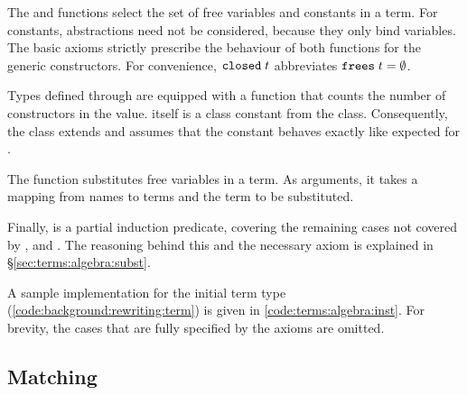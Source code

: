 The  and  functions select the set of free variables and constants in a term.
For constants, abstractions need not be considered, because they only bind variables.
The basic axioms strictly prescribe the behaviour of both functions for the generic constructors.
For convenience, $\texttt{\textup{closed}}\;t$ abbreviates $\texttt{\textup{frees}}\;t = \emptyset$.

Types defined through  are equipped with a  function that counts the number of constructors in the value.
 itself is a class constant from the  class.
Consequently, the  class extends  and assumes that the  constant behaves exactly like expected for .

The  function substitutes free variables in a term.
As arguments, it takes a mapping from names to terms and the term to be substituted.


\noindent
Finally,  is a partial induction predicate, covering the remaining cases not covered by ,  and .
The reasoning behind this and the necessary axiom is explained in §\ref{sec:terms:algebra:subst}.

A sample implementation for the initial term type  (\cref{code:background:rewriting:term}) is given in \cref{code:terms:algebra:inst}.
For brevity, the cases that are fully specified by the axioms are omitted.

\subsection{Matching}
\label{sec:terms:algebra:matching}

